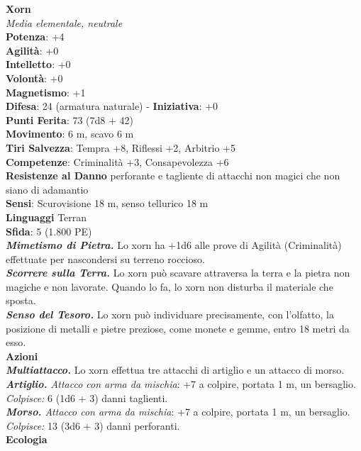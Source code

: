 \begin{multicols}{2}
\medskip\textbf{Xorn}\\
\emph{Media elementale, neutrale}\\
\textbf{Potenza}: +4\\
\textbf{Agilità}: +0\\
\textbf{Intelletto}: +0\\
\textbf{Volontà}: +0\\
\textbf{Magnetismo}: +1\\
\textbf{Difesa}: 24 (armatura naturale) - \textbf{Iniziativa}: +0\\
\textbf{Punti Ferita}: 73 (7d8 + 42)\\
\textbf{Movimento}: 6 m, scavo 6 m\\
\textbf{Tiri Salvezza}: Tempra +8, Riflessi +2, Arbitrio +5\\
\textbf{Competenze}: Criminalità +3, Consapevolezza +6\\
\textbf{Resistenze al Danno} perforante e tagliente di attacchi non magici che non siano di adamantio\\
\textbf{Sensi}: Scurovisione 18 m, senso tellurico 18 m\\
\textbf{Linguaggi} Terran\\
\textbf{Sfida}: 5 (1.800 PE)\smallskip\\
\emph{\textbf{Mimetismo di Pietra.}} Lo xorn ha +1d6 alle prove di Agilità (Criminalità) effettuate per nascondersi su terreno roccioso.\\
\emph{\textbf{Scorrere sulla Terra.}} Lo xorn può scavare attraversa la terra e la pietra non magiche e non lavorate. Quando lo fa, lo xorn non disturba il materiale che sposta.\\
\emph{\textbf{Senso del Tesoro.}} Lo xorn può individuare precisamente, con l'olfatto, la posizione di metalli e pietre preziose, come monete e gemme, entro 18 metri da esso.\\
\smallskip\textbf{Azioni}\\
\emph{\textbf{Multiattacco.}} Lo xorn effettua tre attacchi di artiglio e un attacco di morso.\\
\emph{\textbf{Artiglio.} Attacco con arma da mischia}: +7 a colpire, portata 1 m, un bersaglio.\\
\emph{Colpisce:} 6 (1d6 + 3) danni taglienti.\\
\emph{\textbf{Morso.} Attacco con arma da mischia}: +7 a colpire, portata 1 m, un bersaglio.\\
\emph{Colpisce:} 13 (3d6 + 3) danni perforanti.\\
\textbf{Ecologia}\\

\end{multicols}
